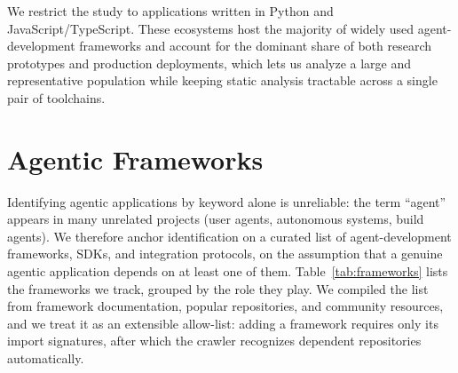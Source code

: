 We restrict the study to applications written in Python and JavaScript/TypeScript. These ecosystems host the majority of widely used agent-development frameworks and account for the dominant share of both research prototypes and production deployments, which lets us analyze a large and representative population while keeping static analysis tractable across a single pair of toolchains.

\section{Agentic Frameworks}
\label{sec:frameworks}
 
Identifying agentic applications by keyword alone is unreliable: the term ``agent'' appears in many unrelated projects (user agents, autonomous systems, build agents). We therefore anchor identification on a curated list of agent-development frameworks, SDKs, and integration protocols, on the assumption that a genuine agentic application depends on at least one of them. Table~\ref{tab:frameworks} lists the frameworks we track, grouped by the role they play. We compiled the list from framework documentation, popular repositories, and community resources, and we treat it as an extensible allow-list: adding a framework requires only its import signatures, after which the crawler recognizes dependent repositories automatically.
 
